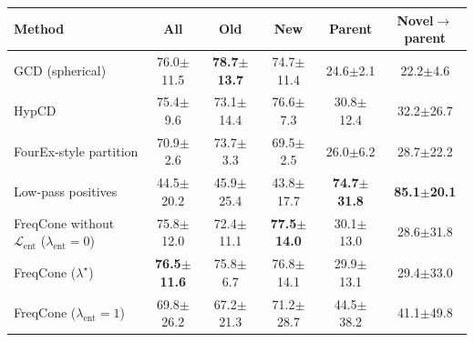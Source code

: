 \begin{tabular}{lccccc}
\toprule
Method & All & Old & New & Parent & Novel$\to$parent \\
\midrule
GCD (spherical) & 76.0{\scriptsize$\pm$11.5} & \textbf{78.7{\scriptsize$\pm$13.7}} & 74.7{\scriptsize$\pm$11.4} & 24.6{\scriptsize$\pm$2.1} & 22.2{\scriptsize$\pm$4.6} \\
HypCD & 75.4{\scriptsize$\pm$9.6} & 73.1{\scriptsize$\pm$14.4} & 76.6{\scriptsize$\pm$7.3} & 30.8{\scriptsize$\pm$12.4} & 32.2{\scriptsize$\pm$26.7} \\
FourEx-style partition & 70.9{\scriptsize$\pm$2.6} & 73.7{\scriptsize$\pm$3.3} & 69.5{\scriptsize$\pm$2.5} & 26.0{\scriptsize$\pm$6.2} & 28.7{\scriptsize$\pm$22.2} \\
Low-pass positives & 44.5{\scriptsize$\pm$20.2} & 45.9{\scriptsize$\pm$25.4} & 43.8{\scriptsize$\pm$17.7} & \textbf{74.7{\scriptsize$\pm$31.8}} & \textbf{85.1{\scriptsize$\pm$20.1}} \\
FreqCone without $\mathcal{L}_{\mathrm{ent}}$ ($\lambda_{\mathrm{ent}}{=}0$) & 75.8{\scriptsize$\pm$12.0} & 72.4{\scriptsize$\pm$11.1} & \textbf{77.5{\scriptsize$\pm$14.0}} & 30.1{\scriptsize$\pm$13.0} & 28.6{\scriptsize$\pm$31.8} \\
FreqCone ($\lambda^\star$) & \textbf{76.5{\scriptsize$\pm$11.6}} & 75.8{\scriptsize$\pm$6.7} & 76.8{\scriptsize$\pm$14.1} & 29.9{\scriptsize$\pm$13.1} & 29.4{\scriptsize$\pm$33.0} \\
FreqCone ($\lambda_{\mathrm{ent}}{=}1$) & 69.8{\scriptsize$\pm$26.2} & 67.2{\scriptsize$\pm$21.3} & 71.2{\scriptsize$\pm$28.7} & 44.5{\scriptsize$\pm$38.2} & 41.1{\scriptsize$\pm$49.8} \\
\bottomrule
\end{tabular}
